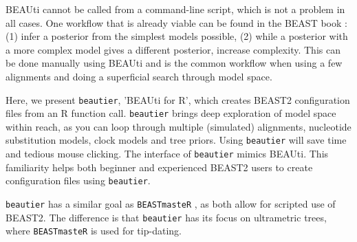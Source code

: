 \documentclass{article}
\begin{document}
BEAUti cannot be called from a command-line script, which is not a problem in all cases.
One workflow that is already viable can be found in the BEAST book \cite{drummond2015bayesian}:
(1) infer a posterior from the simplest models possible, (2) while a posterior with a more complex model gives
a different posterior, increase complexity. This can be done manually using BEAUti and is the common workflow
when using a few alignments and doing a superficial search through model space.  

Here, we present \verb;beautier;, 'BEAUti for R', which 
creates BEAST2 configuration files from an R function call.
\verb;beautier; brings deep exploration of model space within reach,
as you can loop through multiple (simulated) alignments, 
nucleotide substitution models, clock models and tree priors.
Using \verb;beautier; will save time and tedious mouse clicking.
The interface of \verb;beautier; mimics BEAUti. This
familiarity helps both beginner and experienced BEAST2 users 
to create configuration files using \verb;beautier;.

\verb;beautier; has a similar goal as \verb;BEASTmasteR; \cite{beastmaster}, as both
allow for scripted use of BEAST2. The difference is that \verb;beautier; 
has its focus on ultrametric trees, where \verb;BEASTmasteR; is used for tip-dating.
\end{document}
